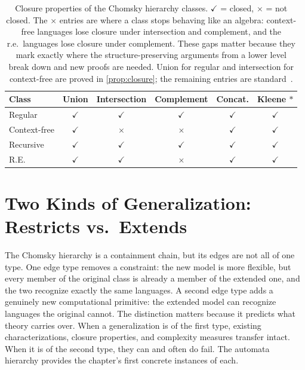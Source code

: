 \begin{table}[ht]
\centering
\small
\caption{Closure properties of the Chomsky hierarchy classes. $\checkmark$ = closed, $\times$ = not closed. The $\times$ entries are where a class stops behaving like an algebra: context-free languages lose closure under intersection and complement, and the r.e.\ languages lose closure under complement. These gaps matter because they mark exactly where the structure-preserving arguments from a lower level break down and new proofs are needed. Union for regular and intersection for context-free are proved in \cref{prop:closure}; the remaining entries are standard~\cite{HopcroftUllman1979}.}
\label{tab:closure}
\begin{tabular}{lccccc}
\toprule
\textbf{Class} & \textbf{Union} & \textbf{Intersection} & \textbf{Complement} & \textbf{Concat.} & \textbf{Kleene $*$} \\
\midrule
Regular       & $\checkmark$ & $\checkmark$ & $\checkmark$ & $\checkmark$ & $\checkmark$ \\
Context-free  & $\checkmark$ & $\times$     & $\times$     & $\checkmark$ & $\checkmark$ \\
Recursive     & $\checkmark$ & $\checkmark$ & $\checkmark$ & $\checkmark$ & $\checkmark$ \\
R.E.          & $\checkmark$ & $\checkmark$ & $\times$     & $\checkmark$ & $\checkmark$ \\
\bottomrule
\end{tabular}
\end{table}


\section{Two Kinds of Generalization: Restricts vs.\ Extends}
\label{sec:restricts-extends}

The Chomsky hierarchy is a containment chain, but its edges are not all of one type. One edge type removes a constraint: the new model is more flexible, but every member of the original class is already a member of the extended one, and the two recognize exactly the same languages. A second edge type adds a genuinely new computational primitive: the extended model can recognize languages the original cannot. The distinction matters because it predicts what theory carries over. When a generalization is of the first type, existing characterizations, closure properties, and complexity measures transfer intact. When it is of the second type, they can and often do fail. The automata hierarchy provides the chapter's first concrete instances of each.


